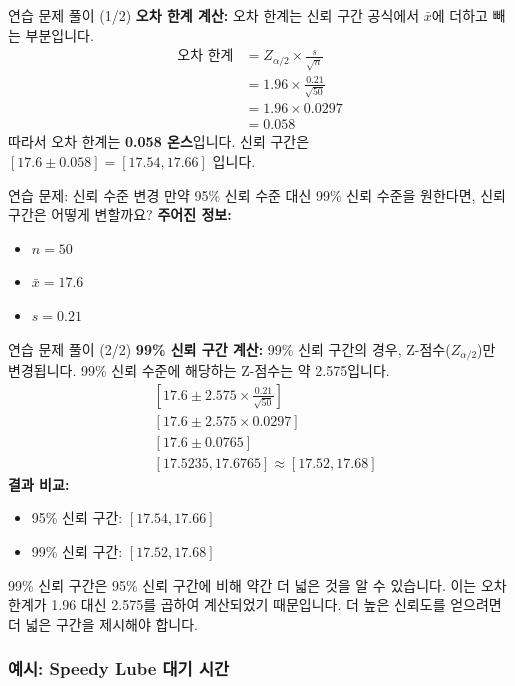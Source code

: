 \documentclass[11pt,a4paper]{article}
\begin{document}
\begin{examplebox}{연습 문제 풀이 (1/2)}
\textbf{오차 한계 계산:}
오차 한계는 신뢰 구간 공식에서 $\bar{x}$에 더하고 빼는 부분입니다.
\begin{align*}
    \text{오차 한계} &= Z_{\alpha/2} \times \frac{s}{\sqrt{n}} \\
    &= 1.96 \times \frac{0.21}{\sqrt{50}} \\
    &= 1.96 \times 0.0297 \\
    &= 0.058
\end{align*}
따라서 오차 한계는 \textbf{0.058 온스}입니다.
신뢰 구간은 $[17.6 \pm 0.058] = [17.54, 17.66]$ 입니다.
\end{examplebox}

\begin{examplebox}{연습 문제: 신뢰 수준 변경}
만약 95\% 신뢰 수준 대신 99\% 신뢰 수준을 원한다면, 신뢰 구간은 어떻게 변할까요?
\textbf{주어진 정보:}
\begin{itemize}
    \item $n = 50$
    \item $\bar{x} = 17.6$
    \item $s = 0.21$
\end{itemize}
\end{examplebox}

\begin{examplebox}{연습 문제 풀이 (2/2)}
\textbf{99\% 신뢰 구간 계산:}
99\% 신뢰 구간의 경우, Z-점수($Z_{\alpha/2}$)만 변경됩니다. 99\% 신뢰 수준에 해당하는 Z-점수는 약 2.575입니다.
\begin{align*}
    & [17.6 \pm 2.575 \times \frac{0.21}{\sqrt{50}}] \\
    & [17.6 \pm 2.575 \times 0.0297] \\
    & [17.6 \pm 0.0765] \\
    & [17.5235, 17.6765] \approx [17.52, 17.68]
\end{align*}
\textbf{결과 비교:}
\begin{itemize}
    \item 95\% 신뢰 구간: $[17.54, 17.66]$
    \item 99\% 신뢰 구간: $[17.52, 17.68]$
\end{itemize}
99\% 신뢰 구간은 95\% 신뢰 구간에 비해 약간 더 넓은 것을 알 수 있습니다. 이는 오차 한계가 1.96 대신 2.575를 곱하여 계산되었기 때문입니다. 더 높은 신뢰도를 얻으려면 더 넓은 구간을 제시해야 합니다.
\end{examplebox}

\subsubsection*{예시: Speedy Lube 대기 시간}
\end{document}
